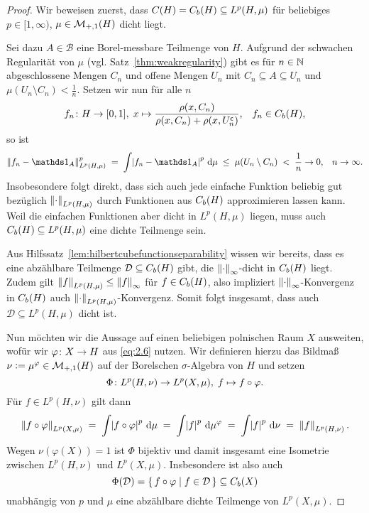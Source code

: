 \documentclass[../main/main.tex]{subfiles}
\begin{document}
	\begin{proof}
		Wir beweisen zuerst, dass $C(H) = C_b(H) \subseteq L^p(H, \mu)$ für beliebiges 
		$p \in [1, \infty)$, $\mu \in \mathcal{M}_{+,1}(H)$ dicht liegt. 
		
		Sei dazu $A \in \mathcal{B}$ eine Borel-messbare Teilmenge von $H$. 
		Aufgrund der schwachen Regularität von $\mu$ (vgl. Satz~\ref{thm:weakregularity}) 
		gibt es für $n \in \mathbb{N}$ abgeschlossene Mengen $C_n$ und offene Mengen 
		$U_n$ mit $C_n \subseteq A \subseteq U_n$ und 
		$\mu(U_n \setminus C_n) < \frac{1}{n}$. Setzen wir nun für alle $n$
		\[f_n \colon H \to [0, 1], \; x \mapsto \frac{\rho(x, C_n)}{\rho(x, C_n) + 
				\rho(x, U_n^\mathsf{c})}  \text{,} \quad f_n \in C_b(H) \text{,}\]
		so ist
		\[ \norm{f_n - \indfct_A}_{L^p(H, \mu)}^p \; = \; 
		\measureint{}{\abs{f_n - \indfct_A}^p}{\mu} \; \leq \; 
		\mu(U_n \setminus C_n) \; < \; \frac{1}{n} \to 0 \text{,} 
		\quad n \to \infty \text{.}\]
		Insobesondere folgt direkt, dass sich auch jede einfache Funktion 
		beliebig gut bezüglich $\left\lVert\cdot\right\rVert_{L^p(H, \mu)}$ durch Funktionen aus $C_b(H)$ 
		approximieren lassen kann. Weil die einfachen Funktionen aber dicht 
		in $L^p(H, \mu)$ liegen, muss auch $C_b(H) \subseteq L^p(H, \mu)$ eine 
		dichte Teilmenge sein.
		
		Aus Hilfssatz~\ref{lem:hilbertcubefunctionseparability} wissen wir 
		bereits, dass es eine abzählbare Teilmenge $\mathcal{D}\subseteq C_b(H)$ 
		gibt, die $\left\lVert\cdot\right\rVert_\infty$-dicht in $C_b(H)$ liegt. Zudem gilt 
		$\left\lVert f\right\rVert_{L^p(H, \mu)} \leq \left\lVert f\right\rVert_\infty$ für $f \in C_b(H)$, also impliziert 
		$\left\lVert\cdot\right\rVert_\infty$-Konvergenz in $C_b(H)$ auch $\left\lVert\cdot\right\rVert_{L^p(H, \mu)}$-Konvergenz. 
		Somit folgt insgesamt, dass auch $\mathcal{D} \subseteq L^p(H, \mu)$ dicht ist.
		
		Nun möchten wir die Aussage auf einen beliebigen polnischen Raum $X$ ausweiten, 
		wofür wir $\varphi \colon X \to H$ aus \eqref{eq:2.6} nutzen.
		Wir definieren hierzu das Bildmaß $\nu \vcentcolon = \mu^\varphi \in \mathcal{M}_{+,1}(H)$ 
		auf der Borelschen $\sigma$-Algebra von $H$ und setzen
		\[\Phi \colon L^p(H, \nu) \to L^p(X, \mu), \; f \mapsto f \circ \varphi  \text{.}\]
		Für $f \in L^p(H, \nu)$ gilt dann
		\[ \left\lVert f \circ \varphi\right\rVert_{L^p(X, \mu)} 
		\; = \; \int_{} \, \left| f \circ \varphi \right|^p \, \mathrm{d}\mu 
		\; = \; \int_{} \, \left| f \right|^p \, \mathrm{d}\mu^\varphi 
		\; = \; \int_{} \, \left| f \right|^p \, \mathrm{d}\nu 
		\; = \; \left\lVert f\right\rVert_{L^p(H, \nu)} \text{.} \]
		Wegen $\nu(\varphi(X)) = 1$ ist $\Phi$ bijektiv und damit insgesamt eine Isometrie 
		zwischen $L^p(H, \nu)$ und $L^p(X, \mu)$. Insbesondere ist also auch 
		\[\Phi(\mathcal{D}) = \left\{\, f \circ \varphi \; \middle| \; f \in \mathcal{D} \,\right\} \subseteq C_b(X)\]
		unabhängig von $p$ und $\mu$ eine abzählbare dichte Teilmenge von $L^p(X, \mu)$.
	\end{proof}
	
\end{document}
